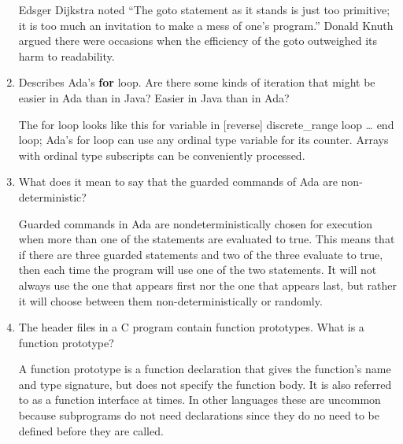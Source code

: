 \begin{enumerate}
  \begin{answer}

    Edsger Dijkstra noted “The goto statement as it stands is just too primitive; it is too much an invitation to make a mess of one’s program.” Donald Knuth argued there were occasions when the efficiency of the goto outweighed its harm to readability.

  \end{answer}

  \item Describes Ada's \textbf{for} loop. Are there some
    kinds of iteration that might be easier in Ada than
    in Java? Easier in Java than in Ada?

  \begin{answer}

  	The for loop looks like this
    for variable in [reverse] discrete\_range loop … end loop;
    Ada’s for loop can use any ordinal type variable for its counter. Arrays with ordinal type subscripts can be conveniently processed.

  \end{answer}

  \item What does it mean to say that the guarded commands
    of Ada are non-deterministic?

  \begin{answer}

  	Guarded commands in Ada are nondeterministically chosen for execution when more than one of the statements are evaluated to true. This means that if there are three guarded statements and two of the three evaluate to true, then each time the program will use one of the two statements. It will not always use the one that appears first nor the one that appears last, but rather it will choose between them non-deterministically or randomly.

  \end{answer}

  \item The header files in a C program contain function
    prototypes. What is a function prototype?

  \begin{answer}

  	A function prototype is a function declaration that gives the function's name and type signature, but does not specify the function body. It is also referred to as a function interface at times. In other languages these are uncommon because subprograms do not need declarations since they do no need to be defined before they are called.


\end{answer}
\end{enumerate}
